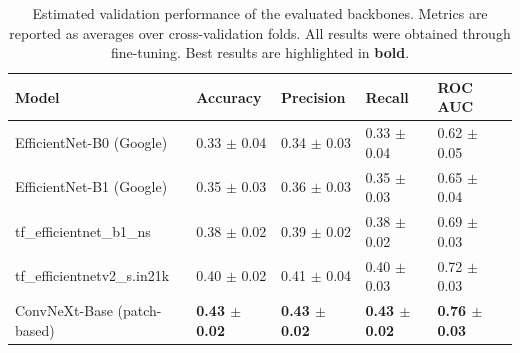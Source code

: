 \documentclass[11pt]{article}
\begin{document}
\begin{table}[t]
    \centering
    \setlength{\tabcolsep}{4pt}
    \caption{Estimated validation performance of the evaluated backbones.
    Metrics are reported as averages over cross-validation folds.
    All results were obtained through fine-tuning.
    Best results are highlighted in \textbf{bold}.}
    \begin{tabularx}{\textwidth}{lYYYYc}
    \toprule
    Model & Accuracy & Precision & Recall & ROC AUC \\
    \midrule
    EfficientNet-B0 (Google)
        & 0.33 $\pm$ 0.04
        & 0.34 $\pm$ 0.03
        & 0.33 $\pm$ 0.04
        & 0.62 $\pm$ 0.05 \\
    
    EfficientNet-B1 (Google)
        & 0.35 $\pm$ 0.03
        & 0.36 $\pm$ 0.03
        & 0.35 $\pm$ 0.03
        & 0.65 $\pm$ 0.04 \\
    
    tf\_efficientnet\_b1\_ns
        & 0.38 $\pm$ 0.02
        & 0.39 $\pm$ 0.02
        & 0.38 $\pm$ 0.02
        & 0.69 $\pm$ 0.03 \\
    
    tf\_efficientnetv2\_s.in21k
        & 0.40 $\pm$ 0.02
        & 0.41 $\pm$ 0.04
        & 0.40 $\pm$ 0.03
        & 0.72 $\pm$ 0.03 \\
    
    ConvNeXt-Base (patch-based)
        & \textbf{0.43 $\pm$ 0.02}
        & \textbf{0.43 $\pm$ 0.02}
        & \textbf{0.43 $\pm$ 0.02}
        & \textbf{0.76 $\pm$ 0.03} \\
    \bottomrule
    \end{tabularx}
    \label{tab:backbone_comparison}
\end{table}

    \newpage

    
    
\end{document}
